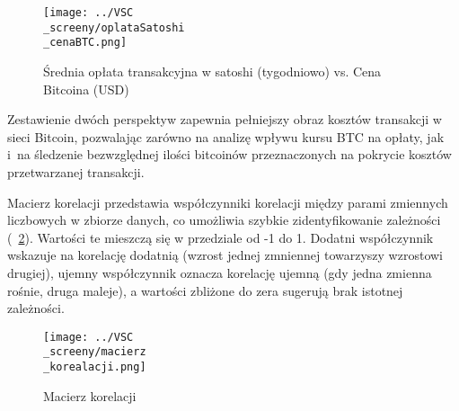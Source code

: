 \documentclass[12pt,a4paper]{report}
\theoremstyle{definition} %
\begin{document}
	\begin{figure}[H]
	    \centering
	    \texttt{[image: ../VSC\\\_screeny/oplataSatoshi\\\_cenaBTC.png]} 
	    \caption{Średnia opłata transakcyjna w satoshi (tygodniowo) vs. Cena Bitcoina (USD)}
	    \label{fig:oplataSatoshi}
	\end{figure}

	Zestawienie dwóch perspektyw zapewnia pełniejszy obraz kosztów transakcji w sieci Bitcoin, pozwalając zarówno na analizę wpływu kursu BTC na opłaty, jak i~na śledzenie bezwzględnej ilości bitcoinów przeznaczonych na pokrycie kosztów przetwarzanej transakcji.

	Macierz korelacji przedstawia współczynniki korelacji między parami zmiennych liczbowych w zbiorze danych, co umożliwia szybkie zidentyfikowanie zależności (\figurename~\ref{fig:macierzKorelacji}). Wartości te mieszczą się w przedziale od -1 do 1. Dodatni współczynnik wskazuje na korelację dodatnią (wzrost jednej zmniennej towarzyszy wzrostowi drugiej), ujemny współczynnik oznacza korelację ujemną (gdy jedna zmienna rośnie, druga maleje), a wartości zbliżone do zera sugerują brak istotnej zależności.

	\begin{figure}[H]
	    \centering
	    \texttt{[image: ../VSC\\\_screeny/macierz\\\_korealacji.png]} 
	    \caption{Macierz korelacji}
	    \label{fig:macierzKorelacji}
	\end{figure}
	
\end{document}
